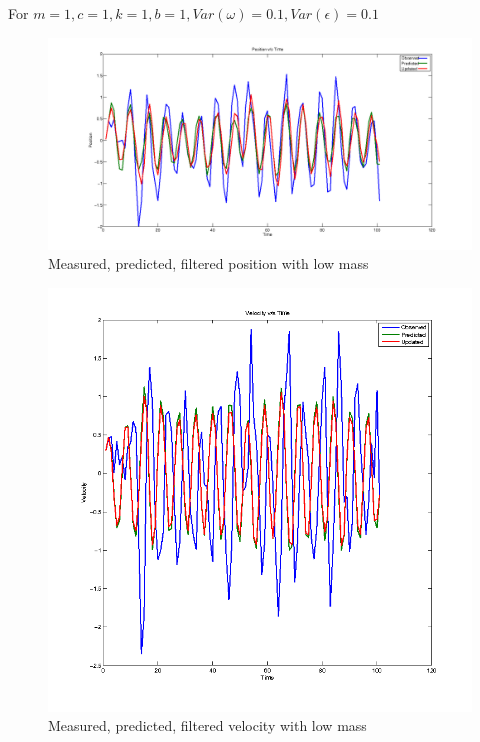 \documentclass[12pt,english]{article}
\begin{document}
For $m=1,c=1,k=1,b=1, Var(\omega)=0.1, Var(\epsilon)=0.1$


\begin{figure}
    \includegraphics[width=\linewidth]{kalman-position-m1}
    \caption{Measured, predicted, filtered position with low mass}
\end{figure}

\begin{figure}
    \includegraphics[width=\linewidth]{kalman-velocity-m1}
    \caption{Measured, predicted, filtered velocity with low mass}
\end{figure}
\end{document}
